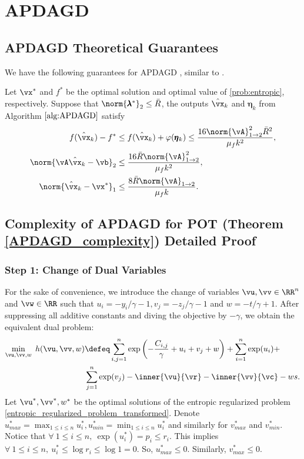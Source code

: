 \section{APDAGD}
\subsection{APDAGD Theoretical Guarantees}
We have the following guarantees for APDAGD , similar to \citep[Theorem 3]{Dvurechensky-2018-Computational}.
\begin{theorem}
    \label{theorem:APDAGD_guarantees}
    Let $\vx^\ast$ and $f^\ast$ be the optimal solution and optimal value of \eqref{prob:entropic}, respectively. Suppose that $\norm{\pmb{\lambda}^\ast}_2 \leq \bar{R}$, the outputs $\hat{\vx}_k$ and $\pmb{\eta}_k$ from Algorithm $\ref{alg:APDAGD}$ satisfy
    \begin{align*}
        f(\hat{\vx}_k) - f^\ast &\leq f(\hat{\vx}_k) + \varphi(\pmb{\eta}_k) \leq  \frac{16 \norm{\vA}^2_{1 \rightarrow 2} \bar{R}^2}{\mu_f k^2}, \\
        \norm{\vA \hat{\vx}_k - \vb}_2 &\leq \frac{16 \bar{R} \norm{\vA}^2_{1 \rightarrow 2}}{\mu_f k^2}, \\
        \norm{\hat{\vx}_k - \vx^\ast}_1 &   \leq \frac{8 \bar{R}\norm{\vA}_{1 \rightarrow 2}}{\mu_f k}. 
    \end{align*}
\end{theorem}

\subsection{Complexity of APDAGD for POT (Theorem \ref{APDAGD_complexity}) Detailed Proof}

\subsubsection{Step 1: Change of Dual Variables}
\label{step 1}
For the sake of convenience, we introduce the change of variables $\vu, \vv \in \RR^n$ and $\vw \in \RR$ such that $u_i = - y_i / \gamma - 1, v_j = - z_j / \gamma - 1$ and $w = -t / \gamma + 1$. After suppressing all additive constants and diving the objective by $- \gamma$, we obtain the equivalent dual problem:
\begin{align} \label{entropic_regularized_problem_transformed}
        \min_{\vu, \vv, w} \; h(\vu,\vv,w) &\defeq \sum_{i, j=1}^{n} \exp \left(- \frac{C_{i, j}}{\gamma} + u_i + v_j + w \right) + \sum_{i=1}^{n} \exp(u_i) + \\
        &\sum_{j=1}^{n} \exp(v_j) -  \inner{\vu}{\vr} - \inner{\vv}{\vc} - ws.
\end{align}
Let $\vu^\ast, \vv^\ast, w^\ast$ be the optimal solutions of the entropic regularized problem \eqref{entropic_regularized_problem_transformed}. Denote $u^\ast_{max} = \max_{1 \leq i \leq n} u^\ast_i, u^\ast_{min} = \min_{1 \leq i \leq n} u^\ast_i$ and similarly for $v^\ast_{max}$ and $v^\ast_{min}.$ Notice that $\forall \: 1 \leq i \leq n, \: \exp (u^\ast_i) = p_i \leq r_i.$ This implies $\forall \: 1 \leq i \leq n, \: u^\ast_i \leq \log{r_i} \leq \log{1} = 0.$ So, $u^\ast_{max} \leq 0$. Similarly, $ v^\ast_{max} \leq 0$. 


